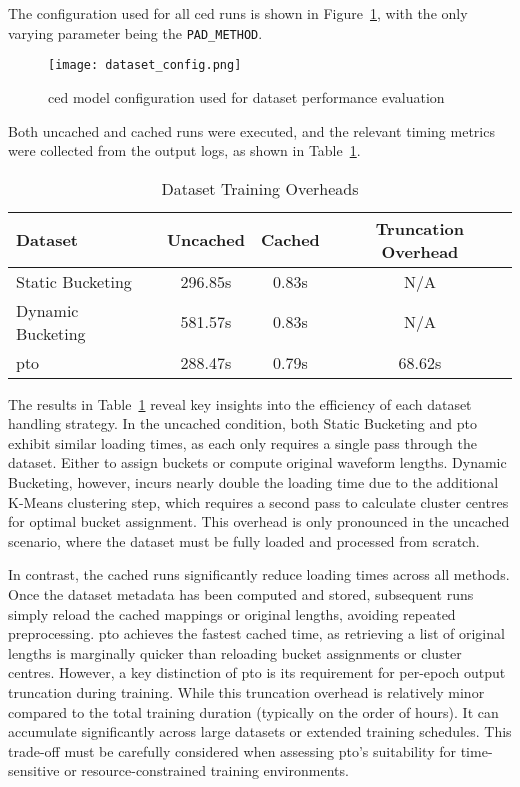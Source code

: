 The configuration used for all \gls{ced} runs is shown in Figure~\ref{fig:dataset_config}, with the only varying parameter being the \texttt{PAD\_METHOD}.

\begin{figure}[H]
    \centering
    \texttt{[image: dataset\_config.png]}
    \caption{\label{fig:dataset_config} \gls{ced} model configuration used for dataset performance evaluation}
\end{figure}

Both uncached and cached runs were executed, and the relevant timing metrics were collected from the output logs, as shown in Table~\ref{tab:dataset_loading_times}.

\vspace{1em}
\begin{table}[H]
\centering
\caption{Dataset Training Overheads}
\label{tab:dataset_loading_times}
\begin{tabular}{|l|c|c|c|}
\hline
\textbf{Dataset} & \textbf{Uncached} & \textbf{Cached} & \textbf{Truncation Overhead} \\
\hline
Static Bucketing  & 296.85s  & 0.83s   & N/A    \\
Dynamic Bucketing & 581.57s& 0.83s  & N/A    \\
\gls{pto}               & 288.47s & 0.79s  & 68.62s  \\
\hline
\end{tabular}
\end{table}

The results in Table~\ref{tab:dataset_loading_times} reveal key insights into the efficiency of each dataset handling strategy. In the uncached condition, both Static Bucketing and \gls{pto} exhibit similar loading times, as each only requires a single pass through the dataset. Either to assign buckets or compute original waveform lengths. Dynamic Bucketing, however, incurs nearly double the loading time due to the additional K-Means clustering step, which requires a second pass to calculate cluster centres for optimal bucket assignment. This overhead is only pronounced in the uncached scenario, where the dataset must be fully loaded and processed from scratch.

In contrast, the cached runs significantly reduce loading times across all methods. Once the dataset metadata has been computed and stored, subsequent runs simply reload the cached mappings or original lengths, avoiding repeated preprocessing. \gls{pto} achieves the fastest cached time, as retrieving a list of original lengths is marginally quicker than reloading bucket assignments or cluster centres. However, a key distinction of \gls{pto} is its requirement for per-epoch output truncation during training. While this truncation overhead is relatively minor compared to the total training duration (typically on the order of hours). It can accumulate significantly across large datasets or extended training schedules. This trade-off must be carefully considered when assessing \gls{pto}'s suitability for time-sensitive or resource-constrained training environments.

